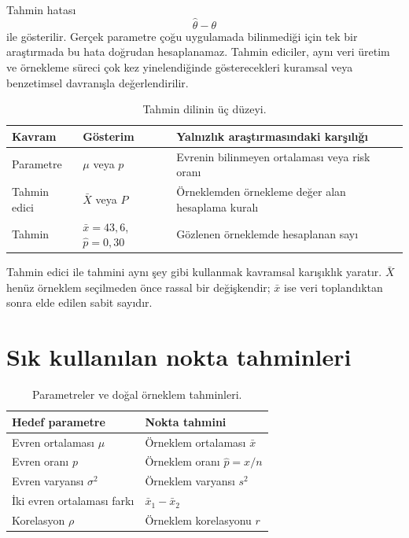 Tahmin hatası
\[
\hat\theta-\theta
\]
ile gösterilir. Gerçek parametre çoğu uygulamada bilinmediği için tek bir
araştırmada bu hata doğrudan hesaplanamaz. Tahmin ediciler, aynı veri üretim ve
örnekleme süreci çok kez yinelendiğinde gösterecekleri kuramsal veya benzetimsel
davranışla değerlendirilir.

\begin{table}[htbp]
\centering
\caption{Tahmin dilinin üç düzeyi.}
\begin{tabular}{@{}p{}p{}p{}@{}}
\toprule
Kavram & Gösterim & Yalnızlık araştırmasındaki karşılığı \\
\midrule
Parametre & $\mu$ veya $p$ & Evrenin bilinmeyen ortalaması veya risk oranı \\
Tahmin edici & $\bar X$ veya $\hat P$ & Örneklemden örnekleme değer alan hesaplama kuralı \\
Tahmin & $\bar x=43{,}6$, $\hat p=0{,}30$ & Gözlenen örneklemde hesaplanan sayı \\
\bottomrule
\end{tabular}
\end{table}

\begin{mistakebox}
Tahmin edici ile tahmini aynı şey gibi kullanmak kavramsal karışıklık yaratır.
$\bar X$ henüz örneklem seçilmeden önce rassal bir değişkendir; $\bar x$ ise
veri toplandıktan sonra elde edilen sabit sayıdır.
\end{mistakebox}

\section{Sık kullanılan nokta tahminleri}

\begin{table}[htbp]
\centering
\caption{Parametreler ve doğal örneklem tahminleri.}
\begin{tabular}{p{}p{}}
\toprule
Hedef parametre & Nokta tahmini \\
\midrule
Evren ortalaması $\mu$ & Örneklem ortalaması $\bar x$ \\
Evren oranı $p$ & Örneklem oranı $\hat p=x/n$ \\
Evren varyansı $\sigma^2$ & Örneklem varyansı $s^2$ \\
İki evren ortalaması farkı & $\bar x_1-\bar x_2$ \\
Korelasyon $\rho$ & Örneklem korelasyonu $r$ \\
\bottomrule
\end{tabular}
\end{table}

